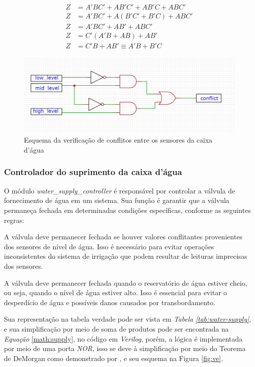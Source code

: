 \documentclass[
	article,			%
	11pt,				%
	oneside,			%
	a4paper,			%
	english,			%
	brazil,				%
	sumario=tradicional
	]{abntex2}
\begin{document}
\begin{equation}
\begin{split}
Z &= A'BC' + AB'C' + AB'C + ABC' \\
Z &= A'BC' + A(B'C' + B'C)  + ABC'\\
Z &= A'BC' + AB' + ABC' \\
Z &= C'(A'B + AB) + AB' \\
Z &= C'B + AB' \equiv A'B + B'C
\label{math:checker}
\end{split}
\end{equation}

\begin{figure}[H]
    \centering
    \includegraphics[width=0.75\linewidth]{error.png}
    \caption{Esquema da verificação de conflitos entre os sensores da caixa d'água}
    \label{fig:error}
\end{figure}



\subsubsection{Controlador do suprimento da caixa d’água}

O módulo \textit{water\_supply\_controller} é responsável por controlar a válvula de fornecimento de água em um sistema. 
Sua função é garantir que a válvula permaneça fechada em determinadas condições específicas, conforme as seguintes regras:

A válvula deve permanecer fechada se houver valores conflitantes provenientes dos sensores de nível de água. 
Isso é necessário para evitar operações inconsistentes do sistema de irrigação que podem resultar de leituras imprecisas dos sensores.

A válvula deve permanecer fechada quando o reservatório de água estiver cheio, ou seja, quando o nível de água estiver alto.
Isso é essencial para evitar o desperdício de água e possíveis danos causados por transbordamento.

Sua representação na tabela verdade pode ser vista em \textit{Tabela \ref{tab:water-supply}}, e sua simplificação por meio de soma de produtos pode ser encontrada na \textit{Equação} \eqref{math:supply}, no código em \textit{Verilog}, porém, a lógica é implementada por meio de uma porta \textit{NOR}, isso se deve à simplificação por meio do Teorema de DeMorgan como demonstrado por \cite{floyd_2007_lgebra}, e seu esquema na Figura \ref{fig:ve}.
\end{document}
